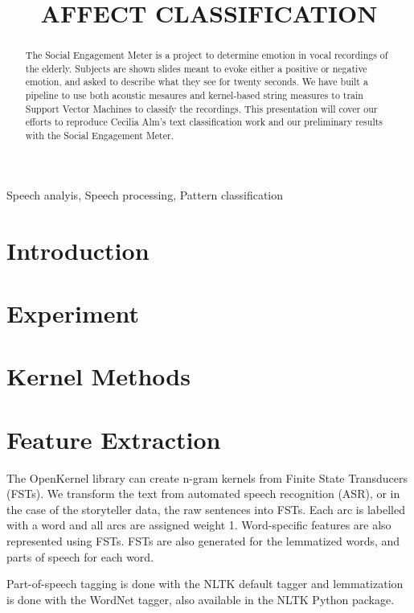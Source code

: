 \documentclass{article}
\title{AFFECT CLASSIFICATION}
\begin{document}
%
\maketitle
%
\begin{abstract}
The Social Engagement Meter is a project to determine emotion in vocal recordings of the elderly. Subjects are shown slides meant to evoke either a positive or negative emotion, and asked to describe what they see for twenty seconds. We have built a pipeline to use both acoustic mesaures and kernel-based string measures to train Support Vector Machines to classify the recordings. This presentation will cover our efforts to reproduce Cecilia Alm's text classification work and our preliminary results with the Social Engagement Meter. \cite{Alm:2002}
\end{abstract}
%
\begin{keywords}
Speech analyis, Speech processing, Pattern classification
\end{keywords}
%
\section{Introduction}
\label{sec:intro}

\section{Experiment}

\section{Kernel Methods}

\section{Feature Extraction}

The OpenKernel library can create n-gram kernels from Finite State Transducers (FSTs). We transform the text from automated speech recognition (ASR), or in the case of the storyteller data, the raw sentences into FSTs. Each arc is labelled with a word and all arcs are assigned weight 1. Word-specific features are also represented using FSTs. FSTs are also generated for the lemmatized words, and parts of speech for each word.

Part-of-speech tagging is done with the NLTK default tagger and lemmatization is done with the WordNet tagger, also available in the NLTK Python package. \cite{NLTK} 
\end{document}
